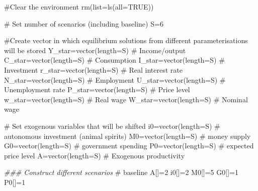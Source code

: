 \documentclass[
  letterpaper,
  DIV=11,
  numbers=noendperiod]{scrreprt}
\newenvironment{Shaded}{\begin{snugshade}}{\end{snugshade}}
\newcommand{\AttributeTok}[1]{\textcolor[rgb]{0.40,0.45,0.13}{#1}}
\newcommand{\CommentTok}[1]{\textcolor[rgb]{0.37,0.37,0.37}{#1}}
\newcommand{\ConstantTok}[1]{\textcolor[rgb]{0.56,0.35,0.01}{#1}}
\newcommand{\DecValTok}[1]{\textcolor[rgb]{0.68,0.00,0.00}{#1}}
\newcommand{\DocumentationTok}[1]{\textcolor[rgb]{0.37,0.37,0.37}{\textit{#1}}}
\newcommand{\FunctionTok}[1]{\textcolor[rgb]{0.28,0.35,0.67}{#1}}
\newcommand{\NormalTok}[1]{\textcolor[rgb]{0.00,0.23,0.31}{#1}}
\newcommand{\OtherTok}[1]{\textcolor[rgb]{0.00,0.23,0.31}{#1}}
\begin{document}
\begin{Shaded}
\begin{Highlighting}[]
\CommentTok{\#Clear the environment}
\FunctionTok{rm}\NormalTok{(}\AttributeTok{list=}\FunctionTok{ls}\NormalTok{(}\AttributeTok{all=}\ConstantTok{TRUE}\NormalTok{))}

\CommentTok{\# Set number of scenarios (including baseline)}
\NormalTok{S}\OtherTok{=}\DecValTok{6}

\CommentTok{\#Create vector in which equilibrium solutions from different parameterisations will be stored}
\NormalTok{Y\_star}\OtherTok{=}\FunctionTok{vector}\NormalTok{(}\AttributeTok{length=}\NormalTok{S) }\CommentTok{\# Income/output}
\NormalTok{C\_star}\OtherTok{=}\FunctionTok{vector}\NormalTok{(}\AttributeTok{length=}\NormalTok{S) }\CommentTok{\# Consumption}
\NormalTok{I\_star}\OtherTok{=}\FunctionTok{vector}\NormalTok{(}\AttributeTok{length=}\NormalTok{S) }\CommentTok{\# Investment}
\NormalTok{r\_star}\OtherTok{=}\FunctionTok{vector}\NormalTok{(}\AttributeTok{length=}\NormalTok{S) }\CommentTok{\# Real interest rate}
\NormalTok{N\_star}\OtherTok{=}\FunctionTok{vector}\NormalTok{(}\AttributeTok{length=}\NormalTok{S) }\CommentTok{\# Employment}
\NormalTok{U\_star}\OtherTok{=}\FunctionTok{vector}\NormalTok{(}\AttributeTok{length=}\NormalTok{S) }\CommentTok{\# Unemployment rate}
\NormalTok{P\_star}\OtherTok{=}\FunctionTok{vector}\NormalTok{(}\AttributeTok{length=}\NormalTok{S) }\CommentTok{\# Price level}
\NormalTok{w\_star}\OtherTok{=}\FunctionTok{vector}\NormalTok{(}\AttributeTok{length=}\NormalTok{S) }\CommentTok{\# Real wage}
\NormalTok{W\_star}\OtherTok{=}\FunctionTok{vector}\NormalTok{(}\AttributeTok{length=}\NormalTok{S) }\CommentTok{\# Nominal wage}

\CommentTok{\# Set exogenous variables that will be shifted}
\NormalTok{i0}\OtherTok{=}\FunctionTok{vector}\NormalTok{(}\AttributeTok{length=}\NormalTok{S) }\CommentTok{\# autonomous investment (animal spirits)}
\NormalTok{M0}\OtherTok{=}\FunctionTok{vector}\NormalTok{(}\AttributeTok{length=}\NormalTok{S) }\CommentTok{\# money supply}
\NormalTok{G0}\OtherTok{=}\FunctionTok{vector}\NormalTok{(}\AttributeTok{length=}\NormalTok{S) }\CommentTok{\# government spending}
\NormalTok{P0}\OtherTok{=}\FunctionTok{vector}\NormalTok{(}\AttributeTok{length=}\NormalTok{S) }\CommentTok{\# expected price level}
\NormalTok{A}\OtherTok{=}\FunctionTok{vector}\NormalTok{(}\AttributeTok{length=}\NormalTok{S)  }\CommentTok{\# Exogenous productivity}

\DocumentationTok{\#\#\# Construct different scenarios}
\CommentTok{\# baseline }
\NormalTok{A[]}\OtherTok{=}\DecValTok{2}  
\NormalTok{i0[]}\OtherTok{=}\DecValTok{2}
\NormalTok{M0[]}\OtherTok{=}\DecValTok{5}   
\NormalTok{G0[]}\OtherTok{=}\DecValTok{1}   
\NormalTok{P0[]}\OtherTok{=}\DecValTok{1}


\end{Highlighting}
\end{Shaded}
\end{document}
